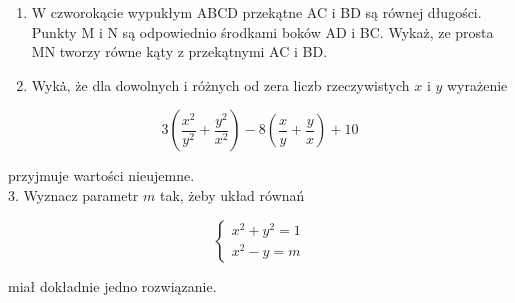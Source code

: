 \documentclass[10pt]{article}
\begin{document}
\begin{enumerate}
  \item W czworokącie wypukłym ABCD przekątne AC i BD są równej długości. Punkty M i N są odpowiednio środkami boków AD i BC. Wykaż, ze prosta MN tworzy równe kąty z przekątnymi AC i BD.
  \item Wykȧ̇, że dla dowolnych i różnych od zera liczb rzeczywistych \(x\) i \(y\) wyrażenie
\end{enumerate}

\[
3\left(\frac{x^{2}}{y^{2}}+\frac{y^{2}}{x^{2}}\right)-8\left(\frac{x}{y}+\frac{y}{x}\right)+10
\]

przyjmuje wartości nieujemne.\\
3. Wyznacz parametr \(m\) tak, żeby układ równań

\[
\left\{\begin{array}{l}
x^{2}+y^{2}=1 \\
x^{2}-y=m
\end{array}\right.
\]

miał dokładnie jedno rozwiązanie.
\end{document}
